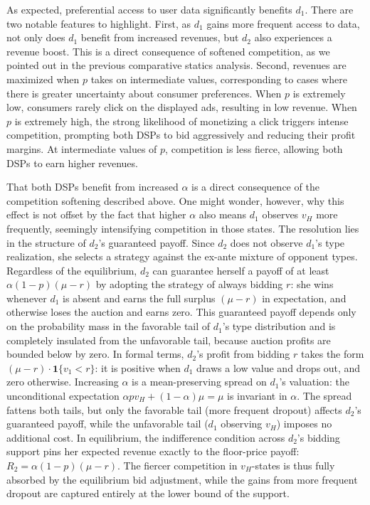 \documentclass[11pt]{article}
\theoremstyle{plain}
\theoremstyle{definition}
\theoremstyle{plain}
\theoremstyle{plain}
\theoremstyle{plain}
\theoremstyle{plain}
\numberwithin{equation}{section}
\begin{document}
\vspace{0.4cm}

\noindent As expected, preferential access to user data significantly benefits $ d_1 $. There are two notable features to highlight. First, as $ d_1 $ gains more frequent access to data, not only does $ d_1 $ benefit from increased revenues, but $ d_2 $ also experiences a revenue boost. This is a direct consequence of softened competition, as we pointed out in the previous comparative statics analysis. Second, revenues are maximized when $ p $ takes on intermediate values, corresponding to cases where there is greater uncertainty about consumer preferences. When $ p $ is extremely low, consumers rarely click on the displayed ads, resulting in low revenue. When $ p $ is extremely high, the strong likelihood of monetizing a click triggers intense competition, prompting both DSPs to bid aggressively and reducing their profit margins. At intermediate values of $ p $, competition is less fierce, allowing both DSPs to earn higher revenues.

\vspace{0.2cm}

\noindent That both DSPs benefit from increased $\alpha$ is a direct consequence of the competition softening described above. One might wonder, however, why this effect is not offset by the fact that higher $\alpha$ also means $d_1$ observes $v_H$ more frequently, seemingly intensifying competition in those states. The resolution lies in the structure of $d_2$'s guaranteed payoff. Since $d_2$ does not observe $d_1$'s type realization, she selects a strategy against the ex-ante mixture of opponent types. Regardless of the equilibrium, $d_2$ can guarantee herself a payoff of at least $\alpha(1-p)(\mu - r)$ by adopting the strategy of always bidding $r$: she wins whenever $d_1$ is absent and earns the full surplus $(\mu - r)$ in expectation, and otherwise loses the auction and earns zero. This guaranteed payoff depends only on the probability mass in the favorable tail of $d_1$'s type distribution and is completely insulated from the unfavorable tail, because auction profits are bounded below by zero. In formal terms, $d_2$'s profit from bidding $r$ takes the form $(\mu - r) \cdot \mathbf{1}\{v_1 < r\}$: it is positive when $d_1$ draws a low value and drops out, and zero otherwise. Increasing $\alpha$ is a mean-preserving spread on $d_1$'s valuation: the unconditional expectation $\alpha p v_H + (1-\alpha)\mu = \mu$ is invariant in $\alpha$. The spread fattens both tails, but only the favorable tail (more frequent dropout) affects $d_2$'s guaranteed payoff, while the unfavorable tail ($d_1$ observing $v_H$) imposes no additional cost. In equilibrium, the indifference condition across $d_2$'s bidding support pins her expected revenue exactly to the floor-price payoff: $R_2 = \alpha(1-p)(\mu - r)$. The fiercer competition in $v_H$-states is thus fully absorbed by the equilibrium bid adjustment, while the gains from more frequent dropout are captured entirely at the lower bound of the support.
\end{document}
